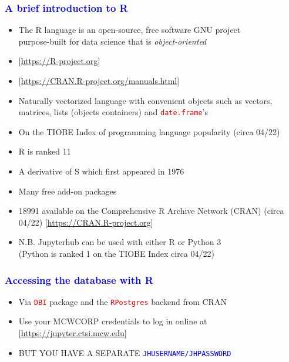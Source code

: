 \documentclass[11pt,pdftex,dvipsnames,usenames]{beamer}
\begin{document}
\begin{frame}[fragile]\frametitle{\bf\textcolor{blue}{A brief introduction to R}}

\begin{itemize}
\item The R language is an open-source, free software GNU project\\
 purpose-built for data science that is {\it object-oriented}
\item \textcolor{PineGreen}{[\href{https://R-project.org}{https://R-project.org}]}
\item \textcolor{PineGreen}{[\href{https://CRAN.R-project.org/manuals.html}{https://CRAN.R-project.org/manuals.html}]}
\item Naturally vectorized language with convenient objects such as vectors,
matrices, lists (objects containers) and 
\textcolor{red}{\texttt{date.frame}}'s
\item On the TIOBE Index of programming language popularity (circa 04/22)
\item R is ranked 11 
\item A derivative of S which first appeared in 1976
\item Many free add-on packages
\item 18991 available on the Comprehensive R Archive Network (CRAN) (circa 04/22) \textcolor{PineGreen}{[\href{https://CRAN.R-project.org}{https://CRAN.R-project.org}]}
\item N.B. Jupyterhub can be used with either R or Python 3\\ 
(Python is ranked 1 on the TIOBE Index circa 04/22)
\end{itemize}

\end{frame}

\begin{frame}[fragile]\frametitle{\bf\textcolor{blue}{Accessing the database with R}}

\begin{itemize}
\item Via \textcolor{red}{\texttt{DBI}} package and the 
\textcolor{red}{\texttt{RPostgres}} backend from CRAN 
\item Use your MCWCORP credentials to log in online at 
\textcolor{PineGreen}{[\href{https://jupyter.ctsi.mcw.edu}{https://jupyter.ctsi.mcw.edu}]}
\item BUT YOU HAVE A SEPARATE \textcolor{blue}{\texttt{JHUSERNAME/JHPASSWORD}}
\end{itemize}


\end{frame}
\end{document}

